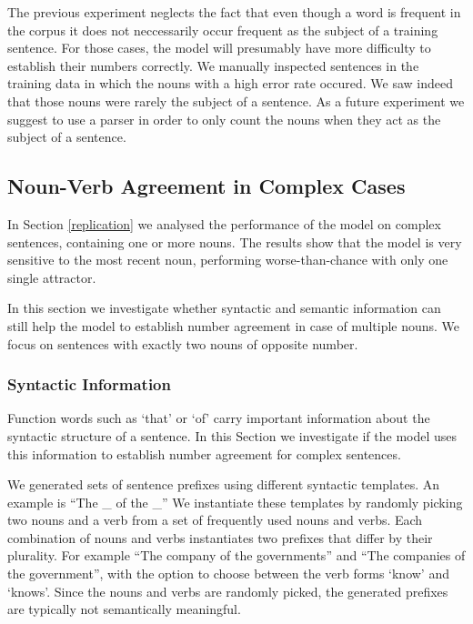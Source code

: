     
The previous experiment neglects the fact that even though a word is frequent in the corpus it does not neccessarily occur frequent as the subject of a training sentence. For those cases, the model will presumably 
have more difficulty to establish their numbers correctly. We manually inspected sentences in the training data in which
the nouns with a high error rate occured. We saw indeed that those nouns were rarely the subject of a sentence. As a future experiment we suggest to use a parser
in order to only count the nouns when they act as the subject of a sentence. 


\subsection{Noun-Verb Agreement in Complex Cases}

In Section \ref{replication} we analysed the performance of the model
on complex sentences, containing one or more 
nouns.
The results show that the model is very
sensitive to the most recent noun,
performing worse-than-chance with only one single attractor.

In this section we investigate whether
syntactic and semantic information
can still help the model 
to establish number agreement
in case of multiple nouns.
We focus on sentences with exactly two nouns
of opposite number.


\subsubsection{Syntactic Information}

Function words such as `that' or `of' carry 
important information about the syntactic structure of a sentence.
In this Section we investigate if the model
uses this information to establish number agreement
for complex sentences.

We generated sets of sentence prefixes using 
different syntactic templates.
An example is ``The \_ of the \_''
We instantiate these templates by randomly
picking two nouns and a verb 
from a set of frequently used nouns and verbs. 
Each combination of nouns and verbs instantiates
two prefixes that differ by their plurality.
For example ``The company of the governments''
and ``The companies of the government'',
with the option to choose between the verb forms
`know' and `knows'.
Since the nouns and verbs are randomly picked,
the generated prefixes 
are typically not semantically
meaningful.

